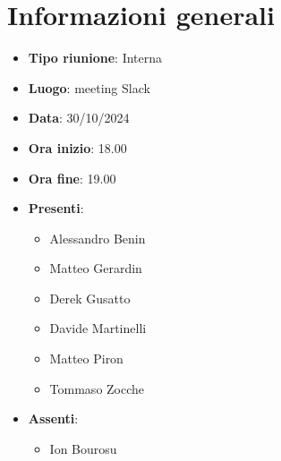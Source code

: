 \section{Informazioni generali}
\begin{itemize}
  \item \textbf{Tipo riunione}: Interna
  \item \textbf{Luogo}: meeting Slack
  \item \textbf{Data}: 30/10/2024
  \item \textbf{Ora inizio}: 18.00
  \item \textbf{Ora fine}: 19.00
  
  \item \textbf{Presenti}:
  \begin{itemize}
    \item Alessandro Benin
    
    \item Matteo Gerardin
    \item Derek Gusatto
    \item Davide Martinelli
    \item Matteo Piron
    \item Tommaso Zocche
  \end{itemize}

  \item \textbf{Assenti}:
  \begin{itemize}
  \item Ion Bourosu
  \end{itemize}
 
\end{itemize}